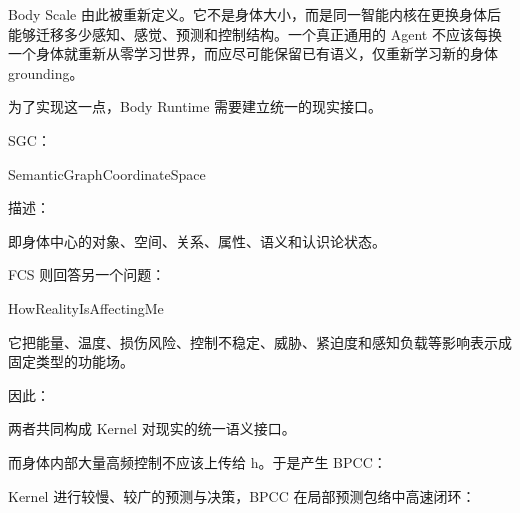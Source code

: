 Body Scale 由此被重新定义。它不是身体大小，而是同一智能内核在更换身体后能够迁移多少感知、感觉、预测和控制结构。一个真正通用的 Agent 不应该每换一个身体就重新从零学习世界，而应尽可能保留已有语义，仅重新学习新的身体 grounding。

为了实现这一点，Body Runtime 需要建立统一的现实接口。

SGC：

\begin{statementbox}
SemanticGraphCoordinateSpace
\end{statementbox}

描述：

\begin{statementbox}
\centering
{}
\end{statementbox}

即身体中心的对象、空间、关系、属性、语义和认识论状态。

FCS 则回答另一个问题：

\begin{statementbox}
HowRealityIsAffectingMe
\end{statementbox}

它把能量、温度、损伤风险、控制不稳定、威胁、紧迫度和感知负载等影响表示成固定类型的功能场。

因此：

\begin{statementbox}
\centering
{}
\end{statementbox}

\begin{statementbox}
\centering
{}
\end{statementbox}

两者共同构成 Kernel 对现实的统一语义接口。

而身体内部大量高频控制不应该上传给 h。于是产生 BPCC：

\begin{statementbox}
\centering
{}
\end{statementbox}

Kernel 进行较慢、较广的预测与决策，BPCC 在局部预测包络中高速闭环：

\begin{statementbox}
\centering
{}
\end{statementbox}

